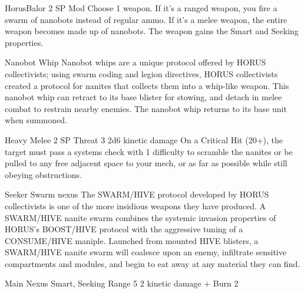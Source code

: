 \begin{mech}{Horus}{Balor}
2 SP
Mod
Choose 1 weapon. If it’s a ranged weapon, you fire a swarm of nanobots instead of regular ammo. If it’s a melee weapon, the entire weapon becomes made up of nanobots. The weapon gains the Smart and Seeking properties.

Nanobot Whip
Nanobot whips are a unique protocol offered by HORUS collectivists; using swarm coding and legion directives, HORUS collectivists created a protocol for nanites that collects them into a whip-like weapon. This nanobot whip can retract to its base blister for stowing, and detach in melee combat to restrain nearby enemies. The nanobot whip returns to its base unit when summoned.

Heavy Melee
2 SP
Threat 3
2d6 kinetic damage
On a Critical Hit (20+), the target must pass a systems check with 1 difficulty to scramble the nanites or be pulled to any free adjacent space to your mech, or as far as possible while still obeying obstructions.

Seeker Swarm nexus
The SWARM/HIVE protocol developed by HORUS collectivists is one of the more insidious weapons they have produced. A SWARM/HIVE nanite swarm combines the systemic invasion properties of HORUS’s BOOST/HIVE protocol with the aggressive tuning of a CONSUME/HIVE maniple. Launched from mounted HIVE blisters, a SWARM/HIVE nanite swarm will coalesce upon an enemy, infiltrate sensitive compartments and modules, and begin to eat away at any material they can find.

Main Nexus
Smart, Seeking
Range 5
2 kinetic damage + Burn 2


\end{mech}
